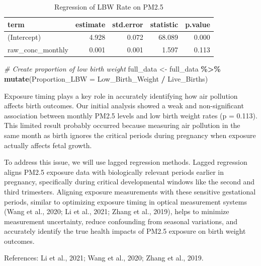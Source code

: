 \documentclass[
]{article}
\newenvironment{Shaded}{\begin{snugshade}}{\end{snugshade}}
\newcommand{\AttributeTok}[1]{\textcolor[rgb]{0.13,0.29,0.53}{#1}}
\newcommand{\CommentTok}[1]{\textcolor[rgb]{0.56,0.35,0.01}{\textit{#1}}}
\newcommand{\FunctionTok}[1]{\textcolor[rgb]{0.13,0.29,0.53}{\textbf{#1}}}
\newcommand{\NormalTok}[1]{#1}
\newcommand{\OtherTok}[1]{\textcolor[rgb]{0.56,0.35,0.01}{#1}}
\newcommand{\SpecialCharTok}[1]{\textcolor[rgb]{0.81,0.36,0.00}{\textbf{#1}}}
\begin{document}
\begin{longtable}[t]{lrrrr}
\caption{\label{tab:unnamed-chunk-3}Regression of LBW Rate on PM2.5}\\
\toprule
term & estimate & std.error & statistic & p.value\\
\midrule
(Intercept) & 4.928 & 0.072 & 68.089 & 0.000\\
raw\_conc\_monthly & 0.001 & 0.001 & 1.597 & 0.113\\
\bottomrule
\end{longtable}

\begin{Shaded}
\begin{Highlighting}[]
\CommentTok{\# Create proportion of low birth weight}
\NormalTok{full\_data }\OtherTok{\textless{}{-}}\NormalTok{ full\_data }\SpecialCharTok{\%\textgreater{}\%}
  \FunctionTok{mutate}\NormalTok{(}\AttributeTok{Proportion\_LBW =}\NormalTok{ Low\_Birth\_Weight }\SpecialCharTok{/}\NormalTok{ Live\_Births)}
\end{Highlighting}
\end{Shaded}

Exposure timing plays a key role in accurately identifying how air
pollution affects birth outcomes. Our initial analysis showed a weak and
non-significant association between monthly PM2.5 levels and low birth
weight rates (p = 0.113). This limited result probably occurred because
measuring air pollution in the same month as birth ignores the critical
periods during pregnancy when exposure actually affects fetal growth.

To address this issue, we will use lagged regression methods. Lagged
regression aligns PM2.5 exposure data with biologically relevant periods
earlier in pregnancy, specifically during critical developmental windows
like the second and third trimesters. Aligning exposure measurements
with these sensitive gestational periods, similar to optimizing exposure
timing in optical measurement systems (Wang et al., 2020; Li et al.,
2021; Zhang et al., 2019), helps to minimize measurement uncertainty,
reduce confounding from seasonal variations, and accurately identify the
true health impacts of PM2.5 exposure on birth weight outcomes.

References: Li et al., 2021; Wang et al., 2020; Zhang et al., 2019.
\end{document}

